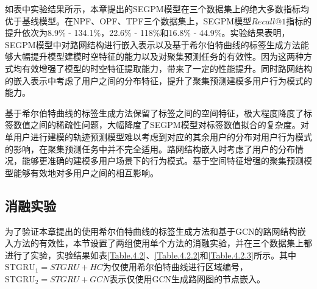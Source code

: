 \documentclass[master]{thesis-uestc}
\begin{document}
如表中实验结果所示，本章提出的SEGPM模型在三个数据集上的绝大多数指标均优于基线模型。在NPF、OPF、TPF三个数据集上，SEGPM模型$Recall@1$指标的提升依次为8.9$\%$ - 134.1$\%$，22.6$\%$ - 118$\%$和16.8$\%$ - 44.9$\%$。实验结果表明，SEGPM模型中对路网结构进行嵌入表示以及基于希尔伯特曲线的标签生成方法能够大幅提升模型建模时空特征的能力以及对聚集预测任务的有效性。因为这两种方式均有效增强了模型的时空特征提取能力，带来了一定的性能提升。同时路网结构的嵌入表示中考虑了用户之间的分布特征，提升了聚集预测建模多用户行为模式的能力。

基于希尔伯特曲线的标签生成方法保留了标签之间的空间特征，极大程度降度了标签数值之间的稀疏性问题，大幅降度了SEGPM模型对标签数值拟合的复杂度。对单用户进行建模的轨迹预测模型难以考虑到对应的其余用户的分布对用户行为模式的影响，在聚集预测任务中并不完全适用。路网结构嵌入时考虑了用户的分布情况，能够更准确的建模多用户场景下的行为模式。基于空间特征增强的聚集预测模型能够有效地对多用户之间的相互影响。

\subsection{消融实验}
为了验证本章提出的使用希尔伯特曲线的标签生成方法和基于GCN的路网结构嵌入方法的有效性，本节设置了两组使用单个方法的消融实验，并在三个数据集上都进行了实验，实验结果如表\ref{Table.4.2}、\ref{Table.4.2.2}和\ref{Table.4.2.3}所示。其中$\mathrm{STGRU}_1=STGRU+HC$为仅使用希尔伯特曲线进行区域编号，$\mathrm{STGRU}_2=STGRU+GCN$表示仅使用GCN生成路网图的节点嵌入。
\end{document}

